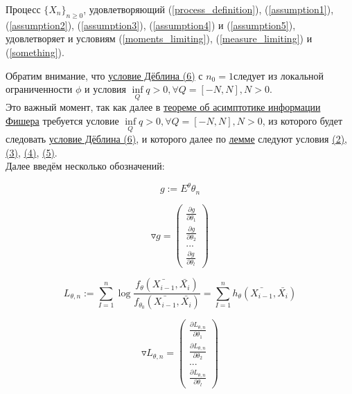 \begin{Lemma} \label{VeretennikovLemma1}
	Процесс $\{X_n\}_{n \geqslant 0}$, удовлетворяющий (\ref{process_definition}), (\ref{assumption1}), (\ref{assumption2}), (\ref{assumption3}), (\ref{assumption4}) и (\ref{assumption5}), удовлетворяет и условиям (\ref{moments_limiting}), (\ref{measure_limiting}) и (\ref{something}).
\end{Lemma}

	Обратим внимание, что \hyperref[Deblin]{условие Дёблина (6)} с $n_0 = 1$следует из локальной ограниченности $\phi$ и условия $\inf\limits_{Q} q>0, \forall Q=[-N, N], N>0$.
	\\
	Это важный момент, так как далее в \hyperref[FisherInformationAsimptotic]{теореме об асимптотике информации Фишера} требуется условие $\inf\limits_{Q} q>0, \forall Q=[-N, N], N>0$,  из которого будет следовать \hyperref[Deblin]{условие Дёблина (6)}, и которого далее по \hyperref[VeretennikovLemma1]{лемме} следуют условия \hyperref[usl2]{(2)}, \hyperref[usl3]{(3)}, \hyperref[usl4]{(4)}, \hyperref[usl5]{(5)}.
	\\
	Далее введём несколько обозначений: %
	
	$$
	g := E^{\theta}\theta_n
	$$
	
	$$
	\triangledown g = \left(\begin{array}{ccc} \frac{\partial g}{\partial \theta_1} \\ \frac{\partial g}{\partial \theta_2} \\ ... \\ \frac{\partial g}{\partial \theta_l} \end{array}\right)
	$$
	
	$$
	L_{\theta, n} := \sum_{I=1}^{n} \log \frac{f_{\theta}\left(\bar{X_{i-1}}, \bar{X_i}\right)}{f_{\theta_0}\left(\bar{X_{i-1}}, \bar{X_i}\right)} = \sum_{I=1}^{n} h_{\theta}\left(\bar{X_{i-1}}, \bar{X_i}\right)
	$$
	
	$$
	\triangledown L_{\theta, n} = \left(\begin{array}{ccc} \frac{\partial L_{\theta, n}}{\partial \theta_1} \\ \frac{\partial L_{\theta, n}}{\partial \theta_2} \\ ... \\ \frac{\partial L_{\theta, n}}{\partial \theta_l} \end{array}\right)
	$$
	
